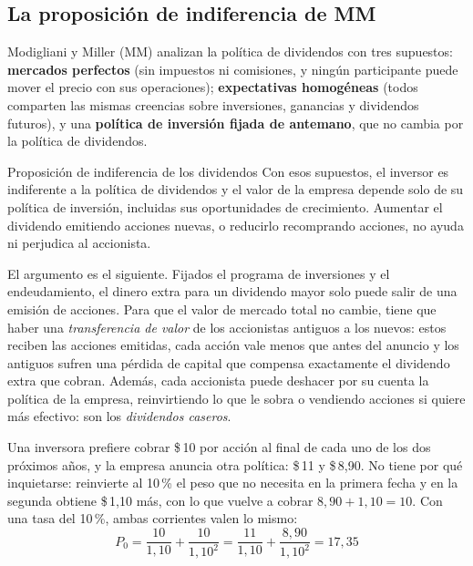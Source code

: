 \subsection{La proposición de indiferencia de MM}

Modigliani y Miller (MM) analizan la política de dividendos con tres supuestos: \textbf{mercados perfectos} (sin impuestos ni comisiones, y ningún participante puede mover el precio con sus operaciones); \textbf{expectativas homogéneas} (todos comparten las mismas creencias sobre inversiones, ganancias y dividendos futuros), y una \textbf{política de inversión fijada de antemano}, que no cambia por la política de dividendos.

\begin{definicion}{Proposición de indiferencia de los dividendos}
Con esos supuestos, el inversor es indiferente a la política de dividendos y el valor de la empresa depende solo de su política de inversión, incluidas sus oportunidades de crecimiento. Aumentar el dividendo emitiendo acciones nuevas, o reducirlo recomprando acciones, no ayuda ni perjudica al accionista.
\end{definicion}

El argumento es el siguiente. Fijados el programa de inversiones y el endeudamiento, el dinero extra para un dividendo mayor solo puede salir de una emisión de acciones. Para que el valor de mercado total no cambie, tiene que haber una \emph{transferencia de valor} de los accionistas antiguos a los nuevos: estos reciben las acciones emitidas, cada acción vale menos que antes del anuncio y los antiguos sufren una pérdida de capital que compensa exactamente el dividendo extra que cobran. Además, cada accionista puede deshacer por su cuenta la política de la empresa, reinvirtiendo lo que le sobra o vendiendo acciones si quiere más efectivo: son los \emph{dividendos caseros}.

\begin{ejemplo}
Una inversora prefiere cobrar \$\,10 por acción al final de cada uno de los dos próximos años, y la empresa anuncia otra política: \$\,11 y \$\,8,90. No tiene por qué inquietarse: reinvierte al 10\,\% el peso que no necesita en la primera fecha y en la segunda obtiene \$\,1,10 más, con lo que vuelve a cobrar $8{,}90 + 1{,}10 = 10$. Con una tasa del 10\,\%, ambas corrientes valen lo mismo:
\[
P_0 = \frac{10}{1{,}10} + \frac{10}{1{,}10^{2}} = \frac{11}{1{,}10} + \frac{8{,}90}{1{,}10^{2}} = 17{,}35
\]
\end{ejemplo}

